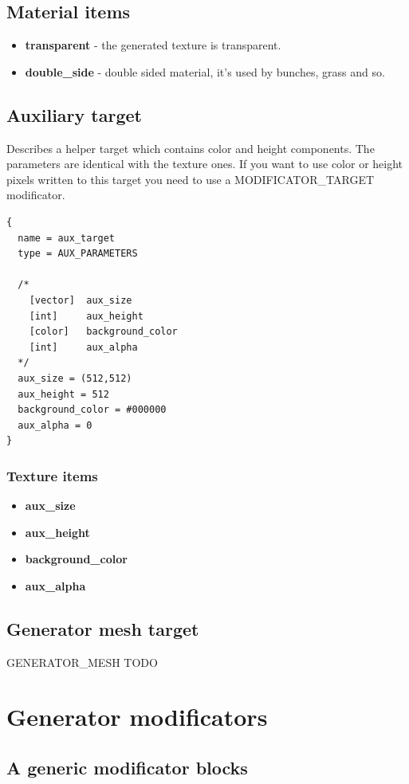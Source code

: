 \documentclass[9pt]{article}
\begin{document}
\subsection*{Material items}
\begin{itemize}
\item{\bf transparent} - the generated texture is transparent.
\item{\bf double\_side} - double sided material, it's used by bunches, grass and so.
\end{itemize}

\newpage
\subsection{Auxiliary target}

Describes a helper target which contains color and height components. 
The parameters are identical with the texture ones. If you want to use color 
or height pixels written to this target you need to use a MODIFICATOR\_TARGET
modificator.

\begin{verbatim}
{
  name = aux_target
  type = AUX_PARAMETERS

  /*
    [vector]  aux_size
    [int]     aux_height
    [color]   background_color
    [int]     aux_alpha
  */
  aux_size = (512,512)  
  aux_height = 512
  background_color = #000000
  aux_alpha = 0
}
\end{verbatim}
\subsubsection*{Texture items}
\begin{itemize}
\item{\bf aux\_size}
\item{\bf aux\_height}
\item{\bf background\_color}
\item{\bf aux\_alpha}
\end{itemize}

\subsection{Generator mesh target}
GENERATOR\_MESH
TODO

\newpage
\section{Generator modificators}

\subsection{A generic modificator blocks}
\end{document}
